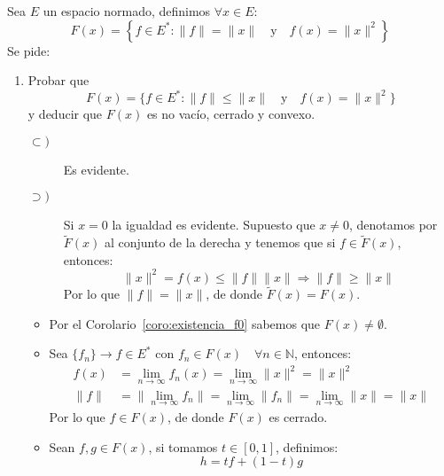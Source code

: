 \begin{ejercicio}
    Sea $E$ un espacio normado, definimos $\forall x\in E$:
    \begin{equation*}
        F(x) = \left\{f\in E^\ast : \|f\| = \|x\| \quad \text{y}\quad f(x)=\|x\|^2\right\}
    \end{equation*}
    Se pide:
    \begin{enumerate}[label=\alph*)]
        \item Probar que
            \begin{equation*}
                F(x) = \{f\in E^\ast : \|f\|\leq \|x\| \quad \text{y}\quad f(x)=\|x\|^2\}
            \end{equation*}
            y deducir que $F(x)$ es no vacío, cerrado y convexo.
            \begin{description}
                \item [$\subset)$] Es evidente.
                \item [$\supset)$] Si $x=0$ la igualdad es evidente. Supuesto que $x\neq 0$, denotamos por $\tilde{F}(x)$ al conjunto de la derecha y tenemos que si $f\in \tilde{F}(x)$, entonces:
                    \begin{equation*}
                        \|x\|^2 = f(x) \leq \|f\|\|x\| \Longrightarrow \|f\|\geq \|x\|
                    \end{equation*}
                    Por lo que $\|f\| = \|x\|$, de donde $\tilde{F}(x) = F(x)$.
            \end{description}
            \begin{itemize}
                \item Por el Corolario~\ref{coro:existencia_f0} sabemos que $F(x)\neq \emptyset $.
                \item Sea $\{f_n\}\to f\in E^\ast$ con $f_n\in F(x) \quad \forall n\in \mathbb{N}$, entonces:
                    \begin{align*}
                        f(x) &= \lim_{n\to\infty}f_n(x) = \lim_{n\to\infty}\|x\|^2 = \|x\|^2 \\
                        \|f\| &= \|\lim_{n\to\infty}f_n\| = \lim_{n\to\infty}\|f_n\| = \lim_{n\to\infty}\|x\| = \|x\|
                    \end{align*}
                    Por lo que $f\in F(x)$, de donde $F(x)$ es cerrado.
                \item Sean $f,g\in F(x)$, si tomamos $t\in [0,1]$, definimos:
                    \begin{equation*}
                        h = tf + (1-t)g

\end{equation*}
\end{itemize}
\end{enumerate}
\end{ejercicio}
